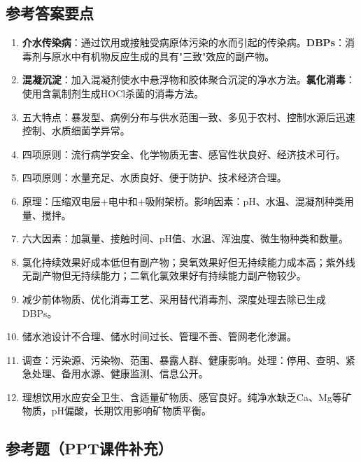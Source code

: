 \subsection*{参考答案要点}

\begin{enumerate}[leftmargin=*, itemsep=5pt]
    \item \textbf{介水传染病}：通过饮用或接触受病原体污染的水而引起的传染病。\textbf{DBPs}：消毒剂与原水中有机物反应生成的具有"三致"效应的副产物。

    \item \textbf{混凝沉淀}：加入混凝剂使水中悬浮物和胶体聚合沉淀的净水方法。\textbf{氯化消毒}：使用含氯制剂生成HOCl杀菌的消毒方法。

    \item 五大特点：暴发型、病例分布与供水范围一致、多见于农村、控制水源后迅速控制、水质细菌学异常。

    \item 四项原则：流行病学安全、化学物质无害、感官性状良好、经济技术可行。

    \item 四项原则：水量充足、水质良好、便于防护、技术经济合理。

    \item 原理：压缩双电层+电中和+吸附架桥。影响因素：pH、水温、混凝剂种类用量、搅拌。

    \item 六大因素：加氯量、接触时间、pH值、水温、浑浊度、微生物种类和数量。

    \item 氯化持续效果好成本低但有副产物；臭氧效果好但无持续能力成本高；紫外线无副产物但无持续能力；二氧化氯效果好有持续能力副产物较少。

    \item 减少前体物质、优化消毒工艺、采用替代消毒剂、深度处理去除已生成DBPs。

    \item 储水池设计不合理、储水时间过长、管理不善、管网老化渗漏。

    \item 调查：污染源、污染物、范围、暴露人群、健康影响。处理：停用、查明、紧急处理、备用水源、健康监测、信息公开。

    \item 理想饮用水应安全卫生、含适量矿物质、感官良好。纯净水缺乏Ca、Mg等矿物质，pH偏酸，长期饮用影响矿物质平衡。
\end{enumerate}

\subsection*{参考题（PPT课件补充）}

